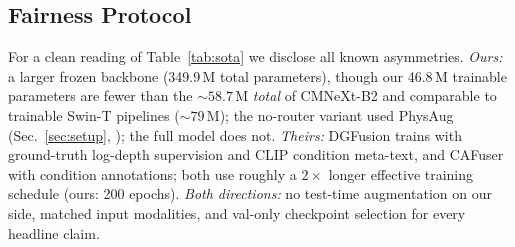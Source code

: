 \subsection{Fairness Protocol}
\label{sec:fairness}

For a clean reading of Table~\ref{tab:sota} we disclose all known
asymmetries. \emph{Ours:} a larger frozen backbone (349.9\,M total
parameters), though our 46.8\,M trainable parameters are fewer than
the ${\sim}58.7$\,M \emph{total} of CMNeXt-B2 and comparable to
trainable Swin-T pipelines (${\sim}79$\,M); the no-router variant used
PhysAug (Sec.~\ref{sec:setup}, ); the full
model does not. \emph{Theirs:} DGFusion trains with ground-truth
log-depth supervision and CLIP condition meta-text, and CAFuser with
condition annotations; both use roughly a $2\times$ longer effective
training schedule (ours: 200 epochs). \emph{Both directions:} no
test-time augmentation on our side, matched input modalities, and
val-only checkpoint selection for every headline claim.

